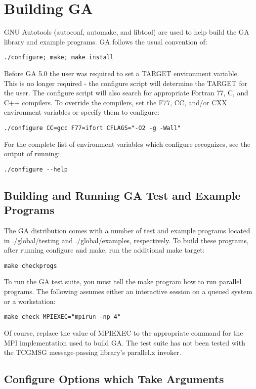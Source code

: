 \section{Building GA}

GNU Autotools (autoconf, automake, and libtool) are used to help build the GA
library and example programs. GA follows the usual convention of:
\begin{verbatim}
./configure; make; make install 
\end{verbatim}
Before GA 5.0 the user was required to set a TARGET environment variable. This
is no longer required - the configure script will determine the TARGET for the
user. The configure script will also search for appropriate Fortran 77, C, and
C++ compilers. To override the compilers, set the F77, CC, and/or CXX
environment variables or specify them to configure:
\begin{verbatim}
./configure CC=gcc F77=ifort CFLAGS="-O2 -g -Wall"
\end{verbatim}
For the complete list of environment variables which configure recognizes, see
the output of running: 
\begin{verbatim}
./configure --help
\end{verbatim}

\subsection{Building and Running GA Test and Example Programs}

The GA distribution comes with a number of test and example programs located in
./global/testing and ./global/examples, respectively. To build these programs,
after running configure and make, run the additional make target: 
\begin{verbatim}
make checkprogs
\end{verbatim}
To run the GA test suite, you must tell the make program how to run parallel
programs. The following assumes either an interactive session on a queued
system or a workstation: 
\begin{verbatim}
make check MPIEXEC="mpirun -np 4"
\end{verbatim}
Of course, replace the value of MPIEXEC to the appropriate command for the MPI
implementation used to build GA. The test suite has not been tested with the
TCGMSG message-passing library's parallel.x invoker. 

\subsection{Configure Options which Take Arguments}

